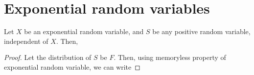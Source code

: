 \documentclass[a4paper,10pt,english]{article}
\begin{document}
\appendix 
\section{Exponential random variables}
\begin{lem} 
Let $X$ be an exponential random variable, and $S$ be any positive random variable, independent of $X$. 
Then,
\end{lem}
\begin{proof}
Let the distribution of $S$ be $F$. 
Then, using memoryless property of exponential random variable, we can write
\end{proof}
\end{document}
